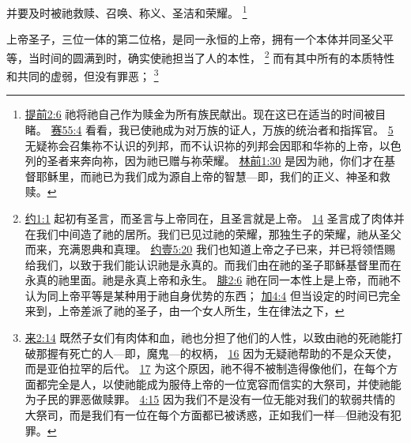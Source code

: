 \documentclass[12pt, a4paper, oneside]{ctexart}
\newcounter{parnum}[section]
\newcommand{\N}{%
   \noindent\refstepcounter{parnum}%
    \makebox[\parindent][l]{\textbf{\arabic{parnum}.}}}
\begin{document}
	并要及时被祂救赎、召唤、称义、圣洁和荣耀。
	\footnote {
		\href{https://biblehub.com/1_timothy/2-6.htm}{提前2:6} 祂将祂自己作为赎金为所有族民献出。现在这已在适当的时间被目睹。
		\href{https://biblehub.com/isaiah/55-4.htm}{赛55:4} 看看，我已使祂成为对万族的证人，万族的统治者和指挥官。
        \href{https://biblehub.com/isaiah/55-5.htm}{5} 无疑祢会召集祢不认识的列邦，而不认识祢的列邦会因耶和华祢的上帝，以色列的圣者来奔向祢，因为祂已赠与祢荣耀。
		\href{https://biblehub.com/1_corinthians/1-30.htm}{林前1:30} 是因为祂，你们才在基督耶稣里，而祂已为我们成为源自上帝的智慧---即，我们的正义、神圣和救赎。
	}

\N 上帝圣子，三位一体的第二位格，是同一永恒的上帝，拥有一个本体并同圣父平等，当时间的圆满到时，确实使祂担当了人的本性，
	\footnote {
		\href{https://biblehub.com/john/1-1.htm}{约1:1} 起初有圣言，而圣言与上帝同在，且圣言就是上帝。
		\href{https://biblehub.com/john/1-14.htm}{14} 圣言成了肉体并在我们中间造了祂的居所。我们已见过祂的荣耀，那独生子的荣耀，祂从圣父而来，充满恩典和真理。
		\href{https://biblehub.com/1_john/5-20.htm}{约壹5:20} 我们也知道上帝之子已来，并已将领悟赐给我们，以致于我们能认识祂是永真的。而我们由在祂的圣子耶稣基督里而在永真的祂里面。祂是永真上帝和永生。
		\href{https://biblehub.com/philippians/2-6.htm}{腓2:6} 祂在同一本性上是上帝，而祂不认为同上帝平等是某种用于祂自身优势的东西；
		\href{https://biblehub.com/galatians/4-4.htm}{加4:4} 但当设定的时间已完全来到，上帝差派了祂的圣子，由一个女人所生，生在律法之下，
	}
	而有其中所有的本质特性和共同的虚弱，但没有罪恶；
	\footnote {
		\href{https://biblehub.com/hebrews/2-14.htm}{来2:14} 既然子女们有肉体和血，祂也分担了他们的人性，以致由祂的死祂能打破那握有死亡的人---即，魔鬼---的权柄，
		\href{https://biblehub.com/hebrews/2-16.htm}{16} 因为无疑祂帮助的不是众天使，而是亚伯拉罕的后代。
		\href{https://biblehub.com/hebrews/2-17.htm}{17} 为这个原因，祂不得不被制造得像他们，在每个方面都完全是人，以使祂能成为服侍上帝的一位宽容而信实的大祭司，并使祂能为子民的罪恶做赎罪。
		\href{https://biblehub.com/hebrews/4-15.htm}{4:15} 因为我们不是没有一位无能对我们的软弱共情的大祭司，而是我们有一位在每个方面都已被诱惑，正如我们一样---但祂没有犯罪。
	}
\end{document}
